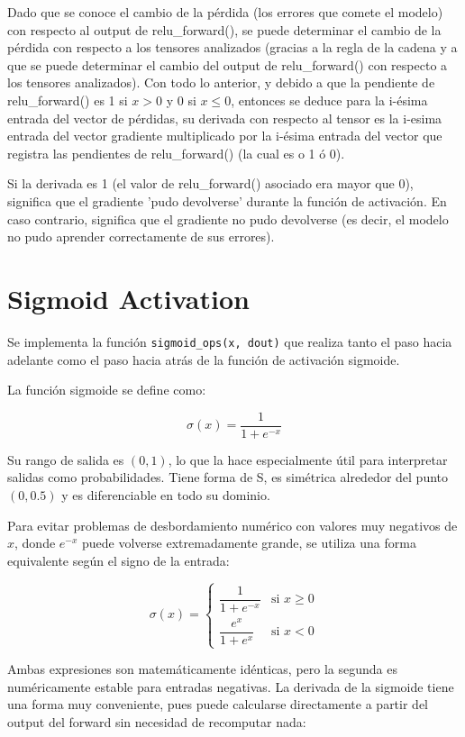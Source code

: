 \documentclass[12pt, letterpaper]{article}
\begin{document}
Dado que se conoce el cambio de la pérdida (los errores que comete el modelo) con respecto al output de relu\_forward(), se puede determinar el cambio de la pérdida con respecto a los tensores analizados (gracias a la regla de la cadena y a que se puede determinar el cambio del output de relu\_forward() con respecto a los tensores analizados). Con todo lo anterior, y debido a que la pendiente de relu\_forward() es 1 si $x>0$ y 0 si $x\leq0$, entonces se deduce para la i-ésima entrada del vector de pérdidas, su derivada con respecto al tensor es la i-esima entrada del vector gradiente multiplicado por la i-ésima entrada del vector que registra las pendientes de relu\_forward() (la cual es o 1 ó 0).

Si la derivada es 1 (el valor de relu\_forward() asociado era mayor que 0), significa que el gradiente 'pudo devolverse' durante la función de activación. En caso contrario, significa que el gradiente no pudo devolverse (es decir, el modelo no pudo aprender correctamente de sus errores).


\newpage

\section{Sigmoid Activation}

Se implementa la función \texttt{sigmoid\_ops(x, dout)} que realiza tanto el paso
hacia adelante como el paso hacia atrás de la función de activación sigmoide.

La función sigmoide se define como:

\[
\sigma(x) = \frac{1}{1+e^{-x}}
\]

Su rango de salida es $(0,1)$, lo que la hace especialmente útil para interpretar
salidas como probabilidades. Tiene forma de S, es simétrica alrededor del punto
$(0, 0.5)$ y es diferenciable en todo su dominio.

Para evitar problemas de desbordamiento numérico con valores muy negativos de $x$,
donde $e^{-x}$ puede volverse extremadamente grande, se utiliza una forma equivalente
según el signo de la entrada:

\[
\sigma(x) = \begin{cases} \dfrac{1}{1+e^{-x}} & \text{si } x \geq 0 \\[10pt] \dfrac{e^{x}}{1+e^{x}} & \text{si } x < 0 \end{cases}
\]

Ambas expresiones son matemáticamente idénticas, pero la segunda es numéricamente
estable para entradas negativas. La derivada de la sigmoide tiene una forma muy
conveniente, pues puede calcularse directamente a partir del output del forward
sin necesidad de recomputar nada:
\end{document}

